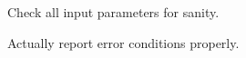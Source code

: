 
\begin{DoxyRefList}
\item[\label{todo__todo000001}%
\hypertarget{todo__todo000001}{}%
page \hyperlink{index}{Epeg Library Documentation} ]Check all input parameters for sanity. 

Actually report error conditions properly.
\end{DoxyRefList}
